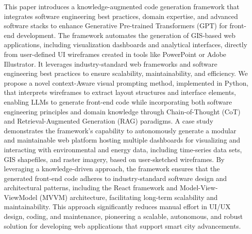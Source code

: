 This paper introduces a knowledge-augmented code generation framework that integrates software engineering best practices, domain expertise, and advanced software stacks to enhance Generative Pre-trained Transformers (GPT) for front-end development. The framework automates the generation of GIS-based web applications, including visualization dashboards and analytical interfaces, directly from user-defined UI wireframes created in tools like PowerPoint or Adobe Illustrator. It leverages industry-standard web frameworks and software engineering best practices to ensure scalability, maintainability, and efficiency. We propose a novel context-Aware visual prompting method, implemented in Python, that interprets wireframes to extract layout structures and interface elements, enabling LLMs to generate front-end code while incorporating both software engineering principles and domain knowledge through Chain-of-Thought (CoT) and Retrieval-Augmented Generation (RAG) paradigms. A case study demonstrates the framework’s capability to autonomously generate a modular and maintainable web platform hosting multiple dashboards for visualizing and interacting with environmental and energy data, including time-series data sets, GIS shapefiles, and raster imagery, based on user-sketched wireframes. By leveraging a knowledge-driven approach, the framework ensures that the generated front-end code adheres to industry-standard software design and architectural patterns, including the React framework and Model-View-ViewModel (MVVM) architecture, facilitating long-term scalability and maintainability. This approach significantly reduces manual effort in UI/UX design, coding, and maintenance, pioneering a scalable, autonomous, and robust solution for developing web applications that support smart city advancements.

 